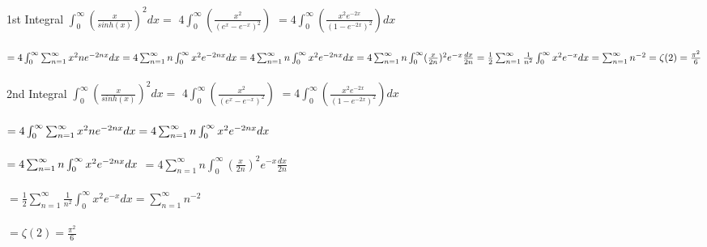 \documentclass{article}
\begin{document}
1st Integral
$\int_{0}^{\infty}\left( \frac{x}{sin h(x)}\right)^{2}dx=$
$4\int_{0}^{\infty}\left( \frac{x^{2}}{(e^{x}-e^{-x})^{2}} \right)$
$=4\int_{0}^{\infty}\left( \frac{x^{2}e^{-2x}}{(1-e^{-2x})^{2}} \right)dx$\\\\
$=4\int_{0}^{\infty}\sum_{n=1}^{\infty }x^{2}ne^{-2nx}dx=4\sum_{n=1}^{\infty }n\int_{0}^{\infty}x^2e^{-2nx}dx\\\\
=4\sum_{n=1}^{\infty }n\int_{0}^{\infty}x^2e^{-2nx}dx=4\sum_{n=1}^{\infty }n\int_{0}^{\infty}(\frac{x}{2n})^2e^{-x}\frac{dx}{2n}\\\\
=\frac{1}{2}\sum_{n=1}^{\infty }\frac{1}{n^2}\int_{0}^{\infty}x^2e^{-x}dx=\sum_{n=1}^{\infty}n^{-2}
=\zeta(2)=\frac{\pi^2}{6}$\\\\

2nd Integral
$\int_{0}^{\infty}\left( \frac{x}{sin h(x)}\right)^{2}dx=$
$4\int_{0}^{\infty}\left( \frac{x^{2}}{(e^{x}-e^{-x})^{2}} \right)$
$=4\int_{0}^{\infty}\left( \frac{x^{2}e^{-2x}}{(1-e^{-2x})^{2}} \right)dx$\\\\
$=4\int_{0}^{\infty}\sum_{n=1}^{\infty }x^{2}ne^{-2nx}dx\\\\
=4\sum_{n=1}^{\infty }n\int_{0}^{\infty}x^2e^{-2nx}dx$\\\\
$=4\sum_{n=1}^{\infty }n\int_{0}^{\infty}x^2e^{-2nx}dx\\\\$
$=4\sum_{n=1}^{\infty }n\int_{0}^{\infty}(\frac{x}{2n})^2e^{-x}\frac{dx}{2n}$\\\\$ =\frac{1}{2}\sum_{n=1}^{\infty }\frac{1}{n^2}\int_{0}^{\infty}x^2e^{-x}dx=\sum_{n=1}^{\infty}n^{-2}$\\\\
$=\zeta(2)=\frac{\pi^2}{6}$\\\\
  
\end{document}
